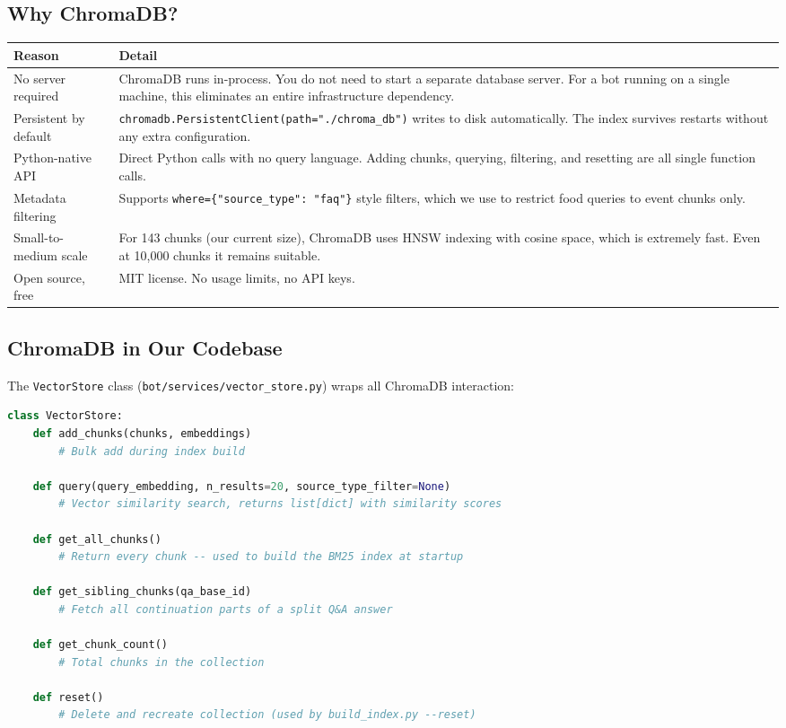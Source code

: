 \documentclass[12pt,letterpaper]{article}
\begin{document}
\subsection{Why ChromaDB?}

\begin{center}
\begin{longtable}{p{3cm}p{10cm}}
\toprule
\textbf{Reason} & \textbf{Detail} \\
\midrule
No server required & ChromaDB runs in-process. You do not need to start a
  separate database server. For a bot running on a single machine, this
  eliminates an entire infrastructure dependency. \\
\midrule
Persistent by default & \texttt{chromadb.PersistentClient(path="./chroma\_db")}
  writes to disk automatically. The index survives restarts without any extra
  configuration. \\
\midrule
Python-native API & Direct Python calls with no query language. Adding chunks,
  querying, filtering, and resetting are all single function calls. \\
\midrule
Metadata filtering & Supports \texttt{where=\{"source\_type": "faq"\}} style
  filters, which we use to restrict food queries to event chunks only. \\
\midrule
Small-to-medium scale & For 143 chunks (our current size), ChromaDB uses HNSW
  indexing with cosine space, which is extremely fast. Even at 10,000 chunks it
  remains suitable. \\
\midrule
Open source, free & MIT license. No usage limits, no API keys. \\
\bottomrule
\end{longtable}
\end{center}

\subsection{ChromaDB in Our Codebase}

The \texttt{VectorStore} class (\texttt{bot/services/vector\_store.py}) wraps
all ChromaDB interaction:

\begin{lstlisting}[language=Python, caption={Key VectorStore methods}]
class VectorStore:
    def add_chunks(chunks, embeddings)
        # Bulk add during index build

    def query(query_embedding, n_results=20, source_type_filter=None)
        # Vector similarity search, returns list[dict] with similarity scores

    def get_all_chunks()
        # Return every chunk -- used to build the BM25 index at startup

    def get_sibling_chunks(qa_base_id)
        # Fetch all continuation parts of a split Q&A answer

    def get_chunk_count()
        # Total chunks in the collection

    def reset()
        # Delete and recreate collection (used by build_index.py --reset)
\end{lstlisting}
\end{document}
